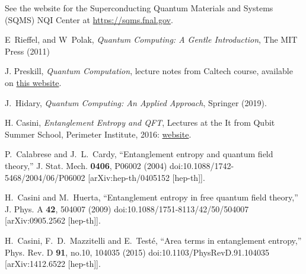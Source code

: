 \documentclass[a4paper,11pt]{article}
\begin{document}
\begin{thebibliography}{99}
See the website for the Superconducting Quantum Materials and Systems (SQMS) NQI Center at \href{https://sqms.fnal.gov/}{https://sqms.fnal.gov}.


E~Rieffel, and W~Polak,
{\it Quantum Computing: A Gentle Introduction},
The MIT Press (2011)

J. Preskill, 
{\it Quantum Computation},
lecture notes from Caltech course, available on \href{http://theory.caltech.edu/~preskill/ph219/ph219_2018-19}{this website}.

J.~Hidary,
{\it Quantum Computing: An Applied Approach},
Springer (2019).

H. Casini,
{\it Entanglement Entropy and QFT},
Lectures at the It from Qubit Summer School, Perimeter Institute, 2016: 
\href{https://www.perimeterinstitute.ca/it-qubit-summer-school/resources/entanglement-qft}{website}.

P.~Calabrese and J.~L.~Cardy,
``Entanglement entropy and quantum field theory,''
J. Stat. Mech. \textbf{0406}, P06002 (2004)
doi:10.1088/1742-5468/2004/06/P06002
[arXiv:hep-th/0405152 [hep-th]].


H.~Casini and M.~Huerta,
``Entanglement entropy in free quantum field theory,''
J. Phys. A \textbf{42}, 504007 (2009)
doi:10.1088/1751-8113/42/50/504007
[arXiv:0905.2562 [hep-th]].


H.~Casini, F.~D.~Mazzitelli and E.~Testé,
``Area terms in entanglement entropy,''
Phys. Rev. D \textbf{91}, no.10, 104035 (2015)
doi:10.1103/PhysRevD.91.104035
[arXiv:1412.6522 [hep-th]].



\end{thebibliography}
\end{document}
